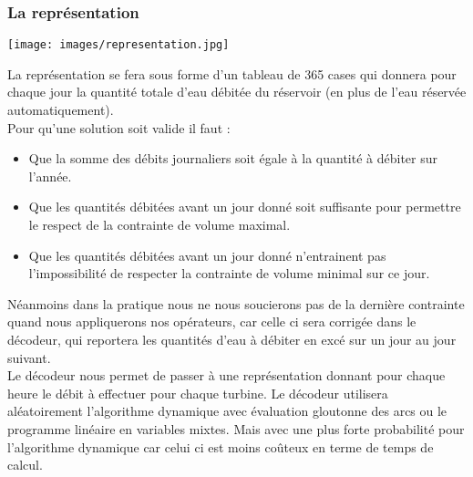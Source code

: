 \documentclass[a4paper]{report}
\begin{document}
\subsubsection{La représentation}
\begin{center}
\texttt{[image: images/representation.jpg]}
\end{center}
La représentation se fera sous forme d'un tableau de 365 cases qui donnera pour chaque jour la quantité totale d'eau débitée du réservoir (en plus de l'eau réservée automatiquement).\\
Pour qu'une solution soit valide il faut :\\
\begin{itemize}
\item Que la somme des débits journaliers soit égale à la quantité à débiter sur l'année.
\item Que les quantités débitées avant un jour donné soit suffisante pour permettre le respect de la contrainte de volume maximal.
\item Que les quantités débitées avant un jour donné n'entrainent pas l'impossibilité de respecter la contrainte de volume minimal sur ce jour.
\end{itemize}
Néanmoins dans la pratique nous ne nous soucierons pas de la dernière contrainte quand nous appliquerons nos opérateurs, car celle ci sera corrigée dans le décodeur, qui reportera les quantités d'eau à débiter en excé sur un jour au jour suivant.\\
Le décodeur nous permet de passer à une représentation donnant pour chaque heure le débit à effectuer pour chaque turbine. Le décodeur utilisera aléatoirement l'algorithme dynamique avec évaluation gloutonne des arcs ou le programme linéaire en variables mixtes. Mais avec une plus forte probabilité pour l'algorithme dynamique car celui ci est moins coûteux en terme de temps de calcul.\\
\end{document}
